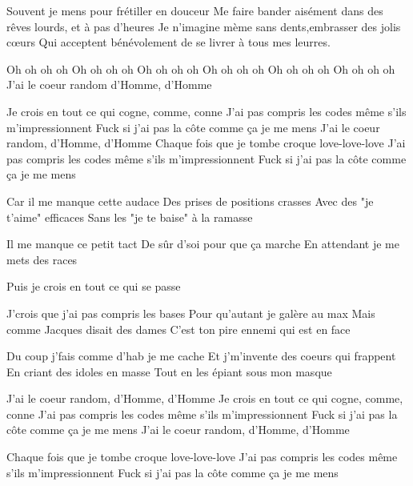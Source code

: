 Souvent je mens pour frétiller en douceur
Me faire bander aisément dans des rêves lourds, et à pas d'heures
Je n'imagine mème sans dents,embrasser des jolis cœurs
Qui acceptent bénévolement de se livrer à tous mes leurres.

Oh oh oh oh
Oh oh oh oh
Oh oh oh oh
Oh oh oh oh
Oh oh oh oh
Oh oh oh oh
J'ai le coeur random d'Homme, d'Homme

Je crois en tout ce qui cogne, comme, conne
J'ai pas compris les codes même s'ils m’impressionnent
Fuck si j’ai pas la côte comme ça je me mens
J'ai le coeur random, d'Homme, d'Homme
Chaque fois que je tombe croque love-love-love
J'ai pas compris les codes même s'ils m'impressionnent
Fuck si j'ai pas la côte comme ça je me mens

Car il me manque cette audace
Des prises de positions crasses
Avec des "je t'aime" efficaces
Sans les "je te baise" à la ramasse

Il me manque ce petit tact
De sûr d'soi pour que ça marche
En attendant je me mets des races

Puis je crois en tout ce qui se passe

J'crois que j'ai pas compris les bases
Pour qu'autant je galère au max
Mais comme Jacques disait des dames
C'est ton pire ennemi qui est en face

Du coup j'fais comme d'hab je me cache
Et j'm'invente des coeurs qui frappent
En criant des idoles en masse
Tout en les épiant sous mon masque

J'ai le coeur random, d'Homme, d'Homme
Je crois en tout ce qui cogne, comme, conne
J'ai pas compris les codes même s'ils m’impressionnent
Fuck si j’ai pas la côte comme ça je me mens
J'ai le coeur random, d'Homme, d'Homme

Chaque fois que je tombe croque love-love-love
J'ai pas compris les codes même s'ils m'impressionnent
Fuck si j'ai pas la côte comme ça je me mens